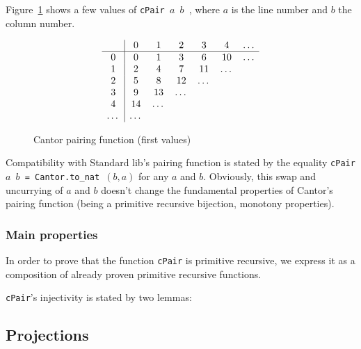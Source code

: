       Figure~\ref{fig:cpair} shows a few values of
      \texttt{cPair\,$a$\,$b$ }, where $a$ is the line number and $b$ the column number.

      \begin{figure}[h]
        \centering

         \[
        \begin{array}[h]{c|cccccc}
          &0&1&2&3&4&\dots \\
          \hline 
          0&0&1&3& 6 & 10&\dots \\
          1&2&4&7&11& \dots& \\
          2&5&8 & 12& \dots&& \\
            3&9&13&\dots & && \\
          4&14&\dots&&&&\\
          \dots&\dots&&&&&\\
        \end{array}
        \]
        
        \caption{Cantor pairing function (first values)\label{fig:cpair}}
      \end{figure}


      \begin{remark}
        Compatibility with Standard lib's pairing function
        is stated
        by the equality \texttt{cPair $a$ $b$ = Cantor.to\_nat $(b,a)$} for any $a$ and $b$. Obviously, this swap and uncurrying of $a$ and $b$ doesn't change the fundamental properties of Cantor's pairing function (being a primitive recursive bijection, monotony properties).
      \end{remark}

      \subsubsection{Main properties}

      In order to prove that the function \texttt{cPair} is primitive recursive, we express it as a composition of already proven primitive recursive functions.


      \texttt{cPair}'s injectivity is stated by two lemmas:


      \subsection{Projections}

